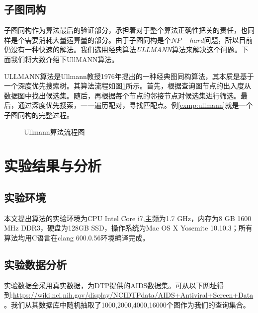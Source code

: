 \documentclass{XDBAthesis}
\numberwithin{algorithm}{chapter}
\begin{document}
\subsection{子图同构}
子图同构作为算法最后的验证部分，承担着对于整个算法正确性把关的责任，也同样是个需要消耗大量运算量的部分。由于子图同构是个$NP-hard$问题，所以目前仍没有一种快速的解法。我们选用经典算法\emph{ULLMANN}算法\cite{ullmann}来解决这个问题。下面我们将大致介绍下UllMANN算法。

ULLMANN算法是Ullmann教授1976年提出的一种经典图同构算法，其本质是基于一个深度优先搜索树。其算法流程如图\ref{fg:ullmanchart}所示。首先，根据查询图节点的出入度从数据图中找出候选集。随后，再根据每个节点的邻接节点对候选集进行筛选。最后，通过深度优先搜索，一一遍历配对，寻找匹配点。例\ref{exmp:ullmann}就是一个子图同构的完整过程。
\begin{figure}
    \caption{Ullmann算法流程图}
    \label{fg:ullmanchart}
\end{figure}
\begin{exmp}
    \label{exmp:ullmann}    
\end{exmp}


\section{实验结果与分析}
\subsection{实验环境}
本文提出算法的实验环境为CPU Intel Core i7,主频为1.7 GHz，内存为8 GB 1600 MHz DDR3，硬盘为128GB SSD，操作系统为Mac OS X Yosemite 10.10.3；所有算法均用C语言在clang 600.0.56环境编译完成。
\subsection{实验数据分析}
实验数据全采用真实数据，为DTP提供的AIDS数据集。可从以下网址得到:\url{https://wiki.nci.nih.gov/display/NCIDTPdata/AIDS+Antiviral+Screen+Data}。我们从其数据库中随机抽取了1000,2000,4000,16000个图作为我们的查询集合。


\ifx\allfiles\undefined


\end{document}
